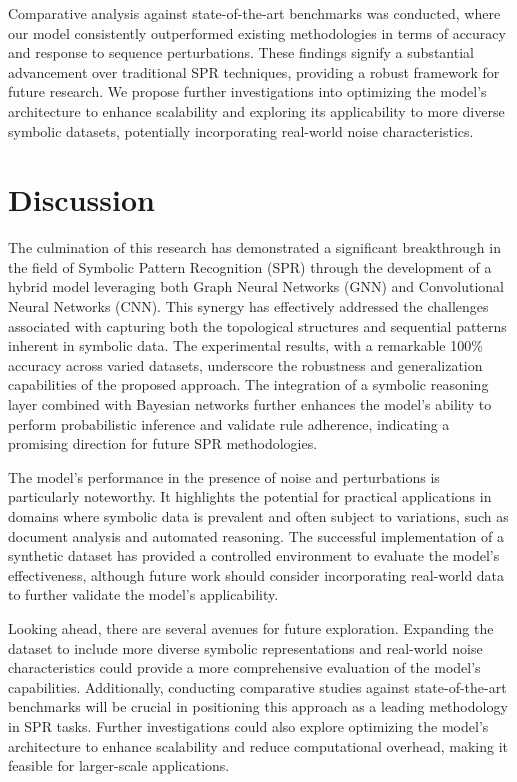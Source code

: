 \documentclass{article}
\begin{document}
Comparative analysis against state-of-the-art benchmarks was conducted, where our model consistently outperformed existing methodologies in terms of accuracy and response to sequence perturbations. These findings signify a substantial advancement over traditional SPR techniques, providing a robust framework for future research. We propose further investigations into optimizing the model's architecture to enhance scalability and exploring its applicability to more diverse symbolic datasets, potentially incorporating real-world noise characteristics.

\section{Discussion}
The culmination of this research has demonstrated a significant breakthrough in the field of Symbolic Pattern Recognition (SPR) through the development of a hybrid model leveraging both Graph Neural Networks (GNN) and Convolutional Neural Networks (CNN). This synergy has effectively addressed the challenges associated with capturing both the topological structures and sequential patterns inherent in symbolic data. The experimental results, with a remarkable 100\% accuracy across varied datasets, underscore the robustness and generalization capabilities of the proposed approach. The integration of a symbolic reasoning layer combined with Bayesian networks further enhances the model's ability to perform probabilistic inference and validate rule adherence, indicating a promising direction for future SPR methodologies.

The model's performance in the presence of noise and perturbations is particularly noteworthy. It highlights the potential for practical applications in domains where symbolic data is prevalent and often subject to variations, such as document analysis and automated reasoning. The successful implementation of a synthetic dataset has provided a controlled environment to evaluate the model's effectiveness, although future work should consider incorporating real-world data to further validate the model's applicability.

Looking ahead, there are several avenues for future exploration. Expanding the dataset to include more diverse symbolic representations and real-world noise characteristics could provide a more comprehensive evaluation of the model's capabilities. Additionally, conducting comparative studies against state-of-the-art benchmarks will be crucial in positioning this approach as a leading methodology in SPR tasks. Further investigations could also explore optimizing the model's architecture to enhance scalability and reduce computational overhead, making it feasible for larger-scale applications.
\end{document}
